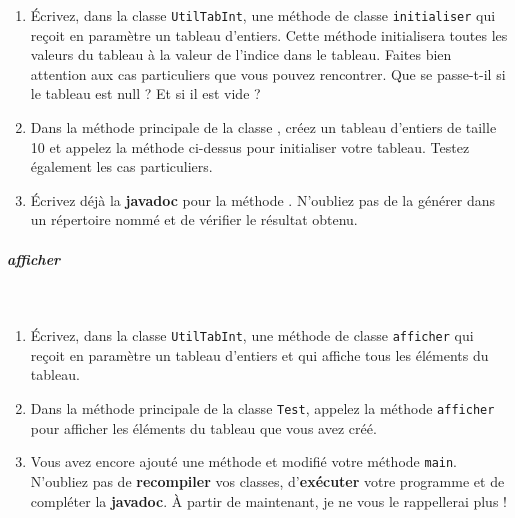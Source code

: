 \documentclass[11pt,a4paper]{article}
\begin{document}
					\begin{enumerate}
				
			\item  
					\'Ecrivez, dans la classe 
					\verb|UtilTabInt|, 
					une m\'ethode de classe 
					\verb|initialiser|    
					qui re\c coit en param\`etre un tableau d'entiers. 
					Cette m\'ethode initialisera toutes les valeurs 
					du tableau \`a la valeur de l'indice dans le tableau.
					Faites bien attention
					aux cas particuliers que vous pouvez rencontrer. 
					Que se passe-t-il si le tableau est null ? 
					Et si il est vide ?
				
			\item  
					Dans la m\'ethode principale de la classe 
					\verb@Test@, 
					cr\'eez un tableau d'entiers de taille 10
					et appelez la m\'ethode 
					\verb@initialiser@ 
					ci-dessus pour initialiser votre tableau.
					Testez \'egalement les cas particuliers.
				
			\item  
					\'Ecrivez d\'ej\`a la 
					\textbf{javadoc} 
					pour la m\'ethode 
					\verb@initialiser@.
					N'oubliez pas de la g\'en\'erer dans un r\'epertoire 
					nomm\'e \verb@javadoc@ 
					et de v\'erifier le r\'esultat obtenu.
				
					\end{enumerate}
				
			
		\subparagraph{afficher} 
		
					\textcolor{white}{.} \par
				
            \par
        
					\begin{enumerate}
				
			\item 
					\'Ecrivez, dans la classe \verb|UtilTabInt|, 
					une m\'ethode de classe \verb|afficher| 
					qui re\c coit en param\`etre un tableau d'entiers et qui affiche tous les \'el\'ements du tableau.
				
			\item  
					Dans la m\'ethode principale de la classe 
					\verb|Test|, 
					appelez la m\'ethode \verb|afficher| 
					pour afficher les \'el\'ements du tableau que vous avez cr\'e\'e.
				
			\item  
					Vous avez encore ajout\'e une m\'ethode et modifi\'e votre m\'ethode \verb|main|. 
					N'oubliez pas de \textbf{recompiler} vos classes,
					d'\textbf{ex\'ecuter} votre programme
					et de compl\'eter la \textbf{javadoc}.
					\`A partir de maintenant, je ne vous le rappellerai plus !
					
					\end{enumerate}
				
\end{document}
